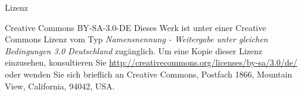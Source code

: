 \documentclass[handout,aspectratio=1610,dvipsnames]{beamer}
\begin{document}
\begin{frame}
  {Lizenz}
  \begin{block}{Creative Commons BY-SA-3.0-DE}
    Dieses Werk ist unter einer Creative Commons Lizenz vom Typ \textit{Namensnennung - Weitergabe unter gleichen Bedingungen 3.0 Deutschland} zugänglich.
    Um eine Kopie dieser Lizenz einzusehen, konsultieren Sie \url{http://creativecommons.org/licenses/by-sa/3.0/de/} oder wenden Sie sich brieflich an Creative Commons, Postfach 1866, Mountain View, California, 94042, USA.
  \end{block}
\end{frame}

\end{document}
